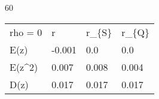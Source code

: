 
60
\begin{tabular}{llll}
\hline
 rho = 0 & r      & r\_\{S\} & r\_\{Q\} \\
 E(z)    & -0.001 & 0.0   & 0.0   \\
 E(z\^{}2)  & 0.007  & 0.008 & 0.004 \\
 D(z)    & 0.017  & 0.017 & 0.017 \\
\hline
\end{tabular}